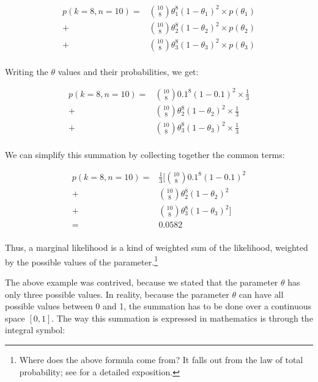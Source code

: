 \documentclass[12pt,]{krantz}
\begin{document}
\begin{equation}
\begin{split}
p(k=8,n=10) =& \binom{10}{8} \theta_1^8 (1-\theta_1)^{2} \times p(\theta_1) \\
            +& \binom{10}{8} \theta_2^8 (1-\theta_2)^{2}\times p(\theta_2) \\
            +& \binom{10}{8} \theta_3^8 (1-\theta_3)^{2}\times p(\theta_3)\\
\end{split}
\end{equation}

Writing the \(\theta\) values and their probabilities, we get:

\begin{equation}
\begin{split}
p(k=8,n=10) =& \binom{10}{8} 0.1^8 (1-0.1)^{2} \times \frac{1}{3} \\
            +& \binom{10}{8} \theta_2^8 (1-\theta_2)^{2}\times \frac{1}{3} \\
            +& \binom{10}{8} \theta_3^8 (1-\theta_3)^{2}\times \frac{1}{3}\\
\end{split}
\end{equation}

We can simplify this summation by collecting together the common terms:

\begin{equation}
\begin{split}
p(k=8,n=10) =& \frac{1}{3} [\binom{10}{8}  0.1^8 (1-0.1)^{2} \\
+& \binom{10}{8} \theta_2^8 (1-\theta_2)^{2} \\
+& \binom{10}{8} \theta_3^8 (1-\theta_3)^{2}] \\
=& 0.0582 \\
\end{split}
\end{equation}

Thus, a marginal likelihood is a kind of weighted sum of the likelihood, weighted by the possible values of the parameter.\footnote{Where does the above formula come from? It falls out from the law of total probability; see \citet{blitzstein2014introduction} for a detailed exposition.}

The above example was contrived, because we stated that the parameter \(\theta\) has only three possible values. In reality, because the parameter \(\theta\) can have all possible values between 0 and 1, the summation has to be done over a continuous space \([0,1]\). The way this summation is expressed in mathematics is through the integral symbol:
\end{document}
